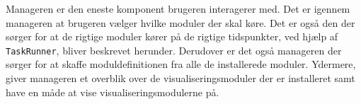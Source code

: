 Manageren er den eneste komponent brugeren interagerer med.
Det er igennem manageren at brugeren vælger hvilke moduler der skal køre.
Det er også den der sørger for at de rigtige moduler kører på de rigtige tidspunkter, ved hjælp af \texttt{TaskRunner}, bliver beskrevet herunder.
Derudover er det også manageren der sørger for at skaffe moduldefinitionen fra alle de installerede moduler.
Ydermere, giver manageren et overblik over de visualiseringsmoduler der er installeret samt have en måde at vise visualiseringsmodulerne på.